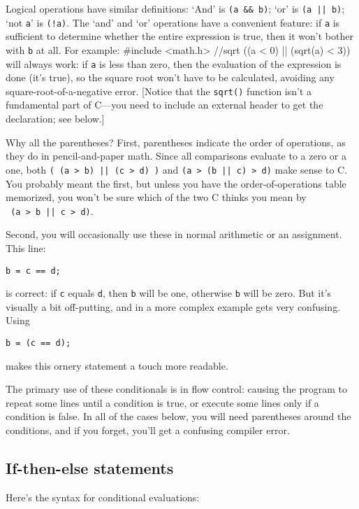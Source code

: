 \documentclass[12pt]{article}
\makeatletter
\def\ttindex#1{\index{#1@{\tt #1}}}
\makeatother
\begin{document}
Logical operations have similar definitions: \ttindex{\&\&} \ttindex{"|"|} 
  
`And' is {\tt (a \&\& b)}; `or' is {\tt (a || b)}; `not {\tt a}' is {\tt (!a)}.
The `and' and `or' operations have a convenient feature: if {\tt a} is sufficient to determine whether
the entire expression is true, then it won't bother with {\tt b} at all. For example:
#include <math.h>    //sqrt
((a < 0) || (sqrt(a) < 3))
will always work: if {\tt a} is less than zero, then the evaluation of the expression is done (it's true),
so the square root won't have to be calculated, avoiding any
square-root-of-a-negative error. [Notice that the {\tt sqrt()} function
isn't a fundamental part of C---you need to include an external header to get the declaration; see below.]

Why all the parentheses? First, parentheses indicate the order of operations, as they do in pencil-and-paper
math. Since all comparisons evaluate to a zero or a one, both {\tt ( (a > b) || (c > d) )} and 
{\tt (a > (b || c) > d)} make sense to C. You probably meant the first, but unless you have
the order-of-operations table memorized, you won't be sure which of the two C thinks you mean by\\ {\tt
(a > b || c > d)}.

Second, you will occasionally use these in normal arithmetic or an assignment. This line:
\begin{verbatim}
b = c == d;
\end{verbatim}
is correct: if {\tt c} equals {\tt d}, then {\tt b} will be one, otherwise {\tt b} will be zero. But
it's visually a bit off-putting, and in a more complex example gets very confusing. Using
\begin{verbatim}
b = (c == d);
\end{verbatim}
makes this ornery statement a touch more readable.

The primary use of these conditionals is in flow control: causing
the program to repeat some lines until a condition is true, or execute some lines only if a condition is
false.  In all of the cases below, you will need parentheses around the conditions, and if you forget,
you'll get a confusing compiler error.

\subsection{If-then-else statements} Here's the syntax for conditional evaluations: \ttindex{if}
\end{document}
